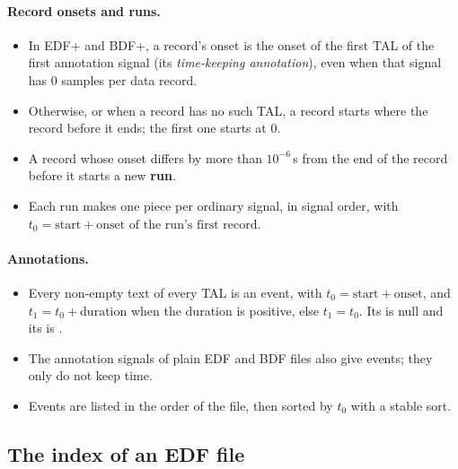 \paragraph{Record onsets and runs.}
\begin{itemize}
\item In EDF+ and BDF+, a record's onset is the onset of the first TAL of the first annotation
  signal (its \emph{time-keeping annotation}), even when that signal has 0 samples per data
  record.
\item Otherwise, or when a record has no such TAL, a record starts where the record before it
  ends; the first one starts at 0.
\item A record whose onset differs by more than $10^{-6}$\,s from the end of the record before it
  starts a new \textbf{run}.
\item Each run makes one piece per ordinary signal, in signal order, with
  $t_0 = \text{start} + \text{onset of the run's first record}$.
\end{itemize}

\paragraph{Annotations.}
\begin{itemize}
\item Every non-empty text of every TAL is an event, with $t_0 = \text{start} + \text{onset}$,
  and $t_1 = t_0 + \text{duration}$ when the duration is positive, else $t_1 = t_0$. Its
   is null and its  is .
\item The annotation signals of plain EDF and BDF files also give events; they only do not keep
  time.
\item Events are listed in the order of the file, then sorted by $t_0$ with a stable sort.
\end{itemize}

\subsection{The index of an EDF file}
\label{sec:formats-reference-edf-index}

